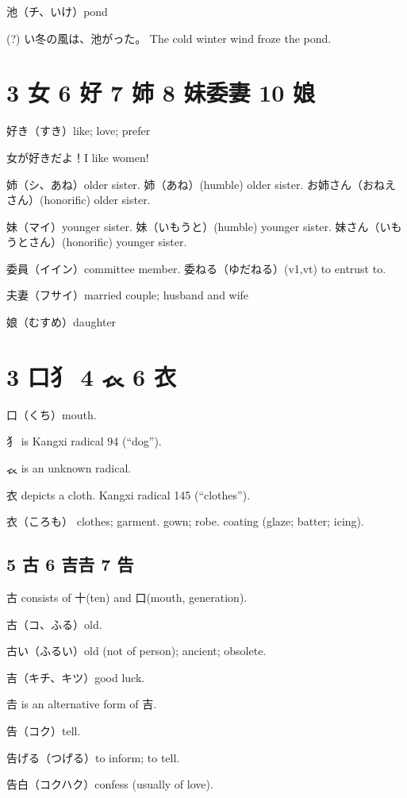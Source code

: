 池（チ、いけ）pond

(?) い冬の風は、池がった。
The cold winter wind froze the pond.

\section{3 女 6 好 7 姉 8 妹委妻 10 娘}

好き（すき）like; love; prefer

女が好きだよ！I like women!

姉（シ、あね）older sister.
姉（あね）(humble) older sister.
お姉さん（おねえさん）(honorific) older sister.

妹（マイ）younger sister.
妹（いもうと）(humble) younger sister.
妹さん（いもうとさん）(honorific) younger sister.

委員（イイン）committee member.
委ねる（ゆだねる）(v1,vt) to entrust to.

夫妻（フサイ）married couple; husband and wife

娘（むすめ）daughter

\section{3 口犭 4 𧘇 6 衣}

口（くち）mouth.

犭 is Kangxi radical 94 (``dog'').

𧘇 is an unknown radical.

衣 depicts a cloth.
Kangxi radical 145 (``clothes'').

衣（ころも）
clothes;
garment. gown;
robe. coating (glaze; batter; icing).

\subsection{5 古 6 吉𠮷 7 告}

古 consists of 十(ten) and 口(mouth, generation).

古（コ、ふる）old.

古い（ふるい）old (not of person); ancient; obsolete.

吉（キチ、キツ）good luck.

𠮷 is an alternative form of 吉.

告（コク）tell.

告げる（つげる）to inform; to tell.

告白（コクハク）confess (usually of love).

